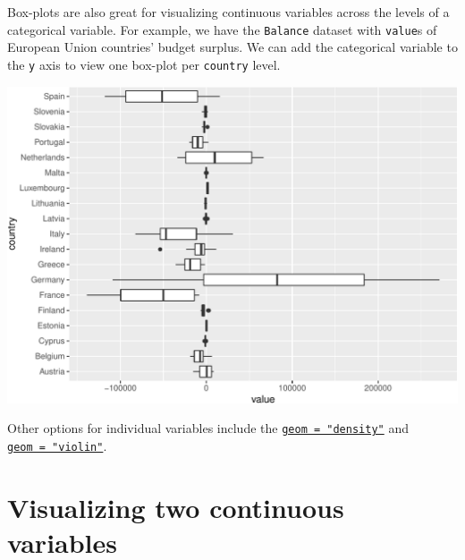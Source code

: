 \documentclass[letterpaper,12pt,twoside,]{pinp}
\begin{document}
Box-plots are also great for visualizing continuous variables across the
levels of a categorical variable. For example, we have the
\texttt{Balance} dataset with \texttt{value}s of European Union
countries' budget surplus. We can add the categorical variable to the
\texttt{y} axis to view one box-plot per \texttt{country} level.

\begin{Shaded}
\begin{Highlighting}[]
\SpecialCharTok{\%\textgreater{}\%} 
\SpecialCharTok{::}\NormalTok{(}
                  \NormalTok{) }
\end{Highlighting}
\end{Shaded}

\begin{center}\includegraphics{03-intro-to-ggplot2_files/figure-latex/Balance-boxplot-country-value-1} \end{center}

Other options for individual variables include the
\href{https://ggplot2.tidyverse.org/reference/geom_density.html}{\texttt{geom\ =\ "density"}}
and
\href{https://ggplot2.tidyverse.org/reference/geom_violin.html}{\texttt{geom\ =\ "violin"}}.

\hypertarget{visualizing-two-continuous-variables}{%
\section{Visualizing two continuous
variables}\label{visualizing-two-continuous-variables}}
\end{document}
